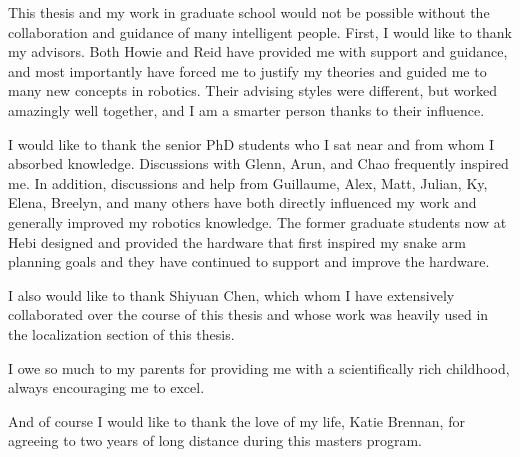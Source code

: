 \documentclass[hidelinks, 12pt]{cmuthesis}
\begin{document}
\begin{acknowledgments}
  This thesis and my work in graduate school would not be possible without the collaboration and guidance of many intelligent people.
  First, I would like to thank my advisors. Both Howie and Reid have provided me with support and guidance, and most importantly have forced me to justify my theories and guided me to many new concepts in robotics. Their advising styles were different, but worked amazingly well together, and I am a smarter person thanks to their influence.
  
  I would like to thank the senior PhD students who I sat near and from whom I absorbed knowledge. Discussions with Glenn, Arun, and Chao frequently inspired me. In addition, discussions and help from Guillaume, Alex, Matt, Julian, Ky, Elena, Breelyn, and many others have both directly influenced my work and generally improved my robotics knowledge.
  The former graduate students now at Hebi designed and provided the hardware that first inspired my snake arm planning goals and they have continued to support and improve the hardware.

  I also would like to thank Shiyuan Chen, which whom I have extensively collaborated over the course of this thesis and whose work was heavily used in the localization section of this thesis.

  I owe so much to my parents for providing me with a scientifically rich childhood, always encouraging me to excel.
  
  And of course I would like to thank the love of my life, Katie Brennan, for agreeing to two years of long distance during this masters program.
  
\end{acknowledgments}



\tableofcontents
\listoffigures

\mainmatter


%
%
%
%
%
\end{document}
